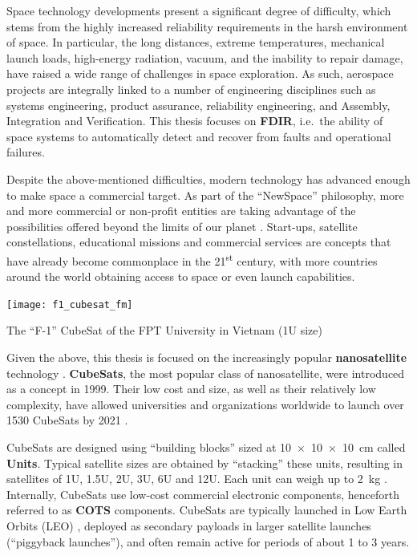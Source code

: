 \documentclass[a4paper,nobib]{tufte-book}
\def\acusepage#1{}
\begin{document}
Space technology developments present a significant degree of difficulty, which stems from the highly increased reliability requirements in the harsh environment of space. In particular, the long distances, extreme temperatures, mechanical launch loads, high-energy radiation, vacuum, and the inability to repair damage, have raised a wide range of challenges in space exploration. As such, aerospace projects are integrally linked to a number of engineering disciplines such as systems engineering, product assurance, reliability engineering, and Assembly, Integration and Verification. This thesis focuses on \textbf{\acf{FDIR}}, i.e.\ the ability of space systems to automatically detect and recover from faults and operational failures.%
	
Despite the above-mentioned difficulties, modern technology has advanced enough to make space a commercial target. As part of the ``NewSpace'' philosophy, more and more commercial or non-profit entities are taking advantage of the possibilities offered beyond the limits of our planet \autocite{denis_new_space_2020}. Start-ups, satellite constellations, educational missions and commercial services are concepts that have already become commonplace in the 21\textsuperscript{st} century, with more countries around the world obtaining access to space or even launch capabilities.
	
\begin{marginfigure}
	\texttt{[image: f1\_cubesat\_fm]}
	\caption{The ``F-1'' CubeSat of the FPT University in Vietnam (1U size)}
	\label{fig:cubesat}
\end{marginfigure}

Given the above, this thesis is focused on the increasingly popular \textbf{nanosatellite} technology \autocite{sweeting_modern_small_2018a}. \textbf{CubeSats}, the most popular class of nanosatellite, were introduced as a concept in 1999. Their low cost and size, as well as their relatively low complexity, have allowed universities and organizations worldwide to launch over 1530 CubeSats by 2021 \autocite{swartwout_cubesat_database_2021}.
	
CubeSats are designed using ``building blocks'' sized at \SI[product-units = single]{10 x 10 x 10}{\centi\metre} called \textbf{Units}. Typical satellite sizes are obtained by ``stacking'' these units, resulting in satellites of 1U, 1.5U, 2U, 3U, 6U and 12U. Each unit can weigh up to \SI{2}{\kilogram} \autocite{CDS14}. Internally,  CubeSats use low-cost commercial electronic components, henceforth referred to as \textbf{\acf{COTS}} components. CubeSats are typically launched in Low Earth Orbits (\acs{LEO}) \autocite{anthopoulos_orbital_analysis_2020,riebeek_catalog_earth_2009}, deployed as secondary payloads in larger satellite launches (``piggyback launches''), and often remain active for periods of about 1 to 3 years.
\end{document}

